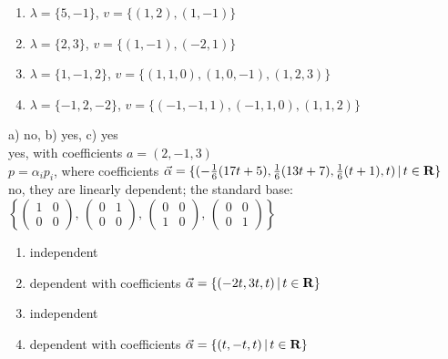 \documentclass[a4paper,10pt]{book}
\def\Real{{\rm\bf R}}
\def\where{\,|\,}                    %
\begin{document}
  \begin{enumerate}[leftmargin=.75cm,align=left,itemsep=-5pt, topsep=-7pt]
    \item $\lambda=\{5,-1\}$, $v=\{(1,2),(1,-1)\}$  
    \item $\lambda=\{2,3\}$, $v=\{(1,-1),(-2,1)\}$  
    \item $\lambda=\{1,-1,2\}$, $v=\{(1,1,0),(1,0,-1),(1,2,3)\}$    
    \item $\lambda=\{-1,2,-2\}$, $v=\{(-1,-1,1),(-1,1,0),(1,1,2)\}$
  \end{enumerate}

 a) no, b) yes, c) yes \\
 yes, with coefficients $a=(2,-1,3)$ \\
 $p = \alpha_i p_i$, where coefficients $\vec\alpha=\{(-\frac{1}{6}(17t+5),
              \frac{1}{6}(13t+7),\frac{1}{6}(t+1),t)\where t\in\Real\}$ \\
 no, they are linearly dependent; the standard base: 
$ \left\{\left(\begin{smallmatrix} 1 & 0 \\ 0 & 0
  \end{smallmatrix}\right),\,
  \left(\begin{smallmatrix}
        0 & 1 \\ 0 & 0
  \end{smallmatrix}\right),\,
  \left(\begin{smallmatrix}
        0 & 0 \\ 1 & 0
  \end{smallmatrix} \right),\,
  \left(\begin{smallmatrix}
        0 & 0 \\ 0 & 1
  \end{smallmatrix}\right)\right\}
$ \\
  \begin{enumerate}[label=\alph*), itemsep=-5pt, topsep=-7pt]
    \item independent
    \item dependent with coefficients $\vec\alpha=\{(-2t,3t,t)\where t\in\Real\}$
    \item independent
    \item dependent with coefficients $\vec\alpha=\{(t,-t,t)\where t\in\Real\}$
  \end{enumerate}
\end{document}
